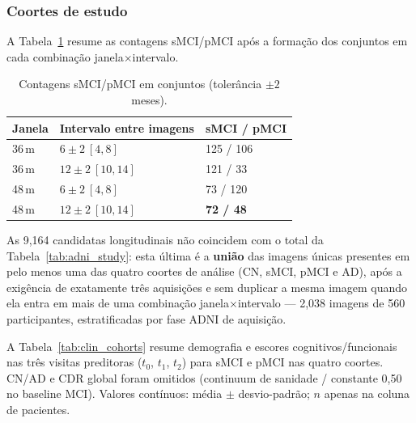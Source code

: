 \documentclass[review]{elsarticle}
\begin{document}
	\subsubsection{Coortes de estudo}
		\label{subsec:coortes}
		
		A Tabela~\ref{tab:coortes} resume as contagens sMCI/pMCI após a formação dos conjuntos em cada combinação janela$\times$intervalo.
		
		\begin{table}[htbp]
		\centering
		\caption{Contagens sMCI/pMCI em conjuntos (tolerância $\pm 2$ meses).}
		\label{tab:coortes}
		\begin{tabular}{lll}
		\toprule
		Janela & Intervalo entre imagens & sMCI / pMCI \\
		\midrule
		36\,m & $6\pm 2\ [4,8]$   & 125 / 106 \\
		36\,m & $12\pm 2\ [10,14]$ & 121 / 33 \\
		48\,m & $6\pm 2\ [4,8]$   & 73 / 120 \\
		48\,m & $12\pm 2\ [10,14]$ & \textbf{72 / 48} \\
		\bottomrule
		\end{tabular}
		\end{table}
		
		As 9{,}164 candidatas longitudinais não coincidem com o total da Tabela~\ref{tab:adni_study}: esta última é a \textbf{união} das imagens únicas presentes em pelo menos uma das quatro coortes de análise (CN, sMCI, pMCI e AD), após a exigência de exatamente três aquisições e sem duplicar a mesma imagem quando ela entra em mais de uma combinação janela$\times$intervalo --- 2{,}038 imagens de 560 participantes, estratificadas por fase ADNI de aquisição.
		
		A Tabela~\ref{tab:clin_cohorts} resume demografia e escores cognitivos/funcionais nas três visitas preditoras ($t_0$, $t_1$, $t_2$) para sMCI e pMCI nas quatro coortes.
		CN/AD e CDR global foram omitidos (continuum de sanidade / constante 0{,}50 no baseline MCI).
		Valores contínuos: média $\pm$ desvio-padrão; $n$ apenas na coluna de pacientes.
		
\end{document}
